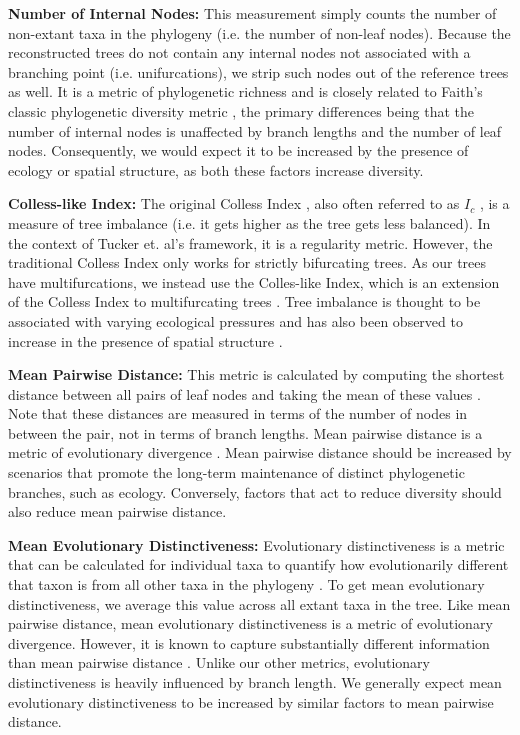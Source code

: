 \textbf{Number of Internal Nodes:} This measurement simply counts the number of non-extant taxa in the phylogeny (i.e. the number of non-leaf nodes). Because the reconstructed trees do not contain any internal nodes not associated with a branching point (i.e. unifurcations), we strip such nodes out of the reference trees as well. It is a metric of phylogenetic richness and is closely related to Faith's classic phylogenetic diversity metric \citep{faithConservationEvaluationPhylogenetic1992}, the primary differences being that the number of internal nodes is unaffected by branch lengths and the number of leaf nodes. Consequently, we would expect it to be increased by the presence of ecology or spatial structure, as both these factors increase diversity.

\textbf{Colless-like Index:} The original Colless Index \citep{collessReviewPhylogeneticsTheory1982}, also often referred to as $I_c$ \citep{shaoTreeBalance1990}, is a measure of tree imbalance (i.e. it gets higher as the tree gets less balanced). In the context of Tucker et. al's framework, it is a regularity metric. However, the traditional Colless Index only works for strictly bifurcating trees. As our trees have multifurcations, we instead use the Colles-like Index, which is an extension of the Colless Index to multifurcating trees \citep{mirSoundCollesslikeBalance2018}. Tree imbalance is thought to be associated with varying ecological pressures \citep{chamberlainPhylogeneticTreeShape2014, burressEcologicalOpportunityAlters} and has also been observed to increase in the presence of spatial structure \citep{scottInferringTumorProliferative2020}.

\textbf{Mean Pairwise Distance:} This metric is calculated by computing the shortest distance between all pairs of leaf nodes and taking the mean of these values \citep{webbExploringPhylogeneticStructure2000}. Note that these distances are measured in terms of the number of nodes in between the pair, not in terms of branch lengths. Mean pairwise distance is a metric of evolutionary divergence \citep{tuckerGuidePhylogeneticMetrics2017}. Mean pairwise distance should be increased by scenarios that promote the long-term maintenance of distinct phylogenetic branches, such as ecology. Conversely, factors that act to reduce diversity should also reduce mean pairwise distance.

\textbf{Mean Evolutionary Distinctiveness:} Evolutionary distinctiveness is a metric that can be calculated for individual taxa to quantify how evolutionarily different that taxon is from all other taxa in the phylogeny \citep{isaacMammalsEDGEConservation2007}. To get mean evolutionary distinctiveness, we average this value across all extant taxa in the tree. Like mean pairwise distance, mean evolutionary distinctiveness is a metric of evolutionary divergence. However, it is known to capture substantially different information than mean pairwise distance \citep{tuckerGuidePhylogeneticMetrics2017}. Unlike our other metrics, evolutionary distinctiveness is heavily influenced by branch length. We generally expect mean evolutionary distinctiveness to be increased by similar factors to mean pairwise distance.


